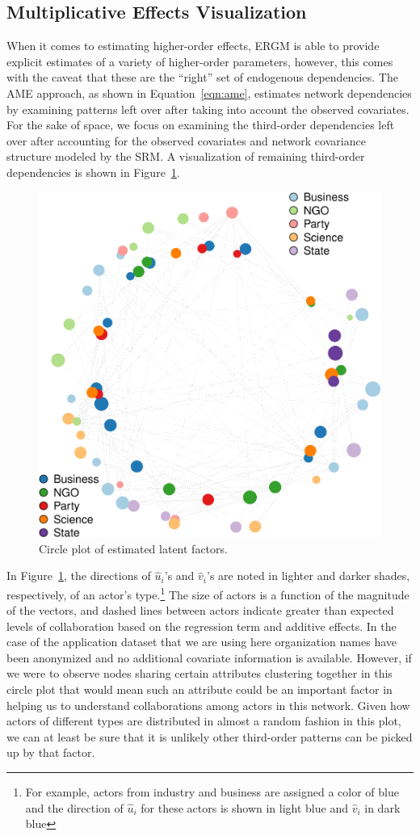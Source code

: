 \documentclass[12pt,pdflatex]{elsarticle}
\begin{document}
\subsection{Multiplicative Effects Visualization}

When it comes to estimating higher-order effects, ERGM is able to provide explicit estimates of a variety of higher-order parameters, however, this comes with the caveat that these are the ``right'' set of endogenous dependencies. The AME approach, as shown in Equation~\ref{eqn:ame}, estimates network dependencies by examining patterns left over after taking into account the observed covariates. For the sake of space, we focus on examining the third-order dependencies left over after accounting for the observed covariates and network covariance structure modeled by the SRM. A visualization of remaining third-order dependencies is shown in Figure~\ref{fig:uv}. 

\begin{figure}[ht]
\centering
	\includegraphics[width=.5\textwidth]{ameFitSR_2_UV}
	\caption{Circle plot of estimated latent factors.}
	\label{fig:uv}
\end{figure}
\FloatBarrier

In Figure~\ref{fig:uv}, the directions of $\hat{u}_{i}$'s and $\hat{v}_{i}$'s are noted in lighter and darker shades, respectively, of an actor's type.\footnote{For example, actors from industry and business are assigned a color of blue and the direction of $\hat{u}_{i}$ for these actors is shown in light blue and $\hat{v}_{i}$ in dark blue} The size of actors is a function of the magnitude of the vectors, and dashed lines between actors indicate greater than expected levels of collaboration based on the regression term and additive effects. In the case of the application dataset that we are using here organization names have been anonymized and no additional covariate information is available. However, if we were to observe nodes sharing certain attributes clustering together in this circle plot that would mean such an attribute could be an important factor in helping us to understand collaborations among actors in this network. Given how actors of different types are distributed in almost a random fashion in this plot, we can at least be sure that it is unlikely other third-order patterns can be picked up by that factor.
\end{document}
